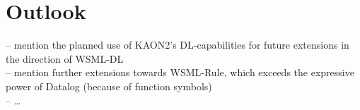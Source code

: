 \section{Outlook\label{sec:outlook}}
-- mention the planned use of KAON2's DL-capabilities for future extensions in the direction of WSML-DL \\
-- mention further extensions towards WSML-Rule, which exceeds the expressive power of Datalog (because of function symbols)\\
-- \dots
